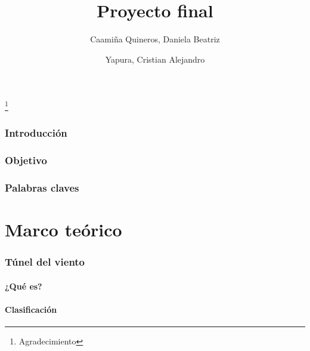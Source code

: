 \documentclass[12pt,a4paper]{article}
\author{Caamiña Quineros, Daniela Beatriz\\ \and Yapura, Cristian Alejandro}
\title{Proyecto final}
\begin{document}
	\maketitle
	\newpage
	\thanks{Agradecimiento}
	\newpage
	\tableofcontents
	\newpage
	\listoffigures
	\newpage
	\section{Introducción}
	\section{Objetivo}
	\section{Palabras claves}
	\newpage
	\part{Marco teórico}
	\section{Túnel del viento}
	\subsection{¿Qué es?}
	\subsection{Clasificación}
\end{document}
